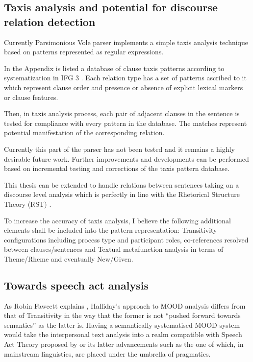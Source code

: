 \subsection{Taxis analysis and potential for discourse relation detection}
Currently Parsimonious Vole parser implements a simple taxis analysis technique based on patterns represented as regular expressions. 


In the Appendix is listed a database of clause taxis patterns according to systematization in IFG 3 \citep{Halliday2004}. Each relation type has a set of patterns ascribed to it which represent clause order and presence or absence of explicit lexical markers or clause features. 

Then, in taxis analysis process, each pair of adjacent clauses in the sentence is tested for compliance with every pattern in the database. The matches represent potential manifestation of the corresponding relation.  

Currently this part of the parser has not been tested and it remains a highly desirable future work. Further improvements and developments can be performed based on incremental testing and corrections of the taxis pattern database.

This thesis can be extended to handle relations between sentences taking on a discourse level analysis which is perfectly in line with the Rhetorical Structure Theory (RST) \citep{Mann1988,Mann1992}. 

To increase the accuracy of taxis analysis, I believe the following additional elements shall be included into the pattern representation: Transitivity configurations including process type and participant roles, co-references resolved between clauses/sentences and Textual metafunction analysis in terms of Theme/Rheme and eventually New/Given.

\subsection{Towards speech act analysis}
As Robin Fawcett explains \citep{Fawcett2011}, Halliday's approach to MOOD analysis differs from that of Transitivity in the way that the former is not ``pushed forward towards semantics'' as the latter is. Having a semantically systematised MOOD system would take the interpersonal text analysis into a realm compatible with Speech Act Theory proposed by \citet{Austin1975} or its latter advancements such as the one of \citet{Searle1969} which, in mainstream linguistics, are placed under the umbrella of pragmatics. 

